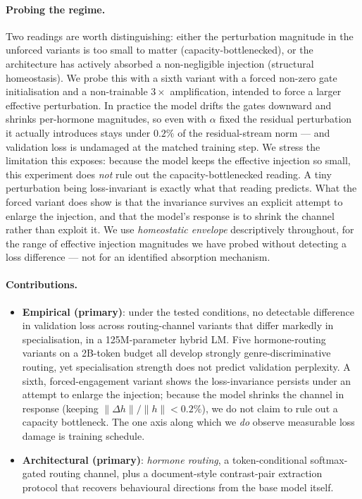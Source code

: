 \paragraph{Probing the regime.} Two readings are worth distinguishing: either the perturbation magnitude in the unforced variants is too small to matter (capacity-bottlenecked), or the architecture has actively absorbed a non-negligible injection (structural homeostasis). We probe this with a sixth variant with a forced non-zero gate initialisation and a non-trainable $3\times$ amplification, intended to force a larger effective perturbation. In practice the model drifts the gates downward and shrinks per-hormone magnitudes, so even with $\alpha$ fixed the residual perturbation it actually introduces stays under $0.2\%$ of the residual-stream norm --- and validation loss is undamaged at the matched training step. We stress the limitation this exposes: because the model keeps the effective injection so small, this experiment does \emph{not} rule out the capacity-bottlenecked reading. A tiny perturbation being loss-invariant is exactly what that reading predicts. What the forced variant does show is that the invariance survives an explicit attempt to enlarge the injection, and that the model's response is to shrink the channel rather than exploit it. We use \emph{homeostatic envelope} descriptively throughout, for the range of effective injection magnitudes we have probed without detecting a loss difference --- not for an identified absorption mechanism.

\paragraph{Contributions.}
\begin{itemize}
    \item \textbf{Empirical (primary)}: under the tested conditions, no detectable difference in validation loss across routing-channel variants that differ markedly in specialisation, in a 125M-parameter hybrid LM. Five hormone-routing variants on a 2B-token budget all develop strongly genre-discriminative routing, yet specialisation strength does not predict validation perplexity. A sixth, forced-engagement variant shows the loss-invariance persists under an attempt to enlarge the injection; because the model shrinks the channel in response (keeping $\|\Delta h\|/\|h\| < 0.2\%$), we do not claim to rule out a capacity bottleneck. The one axis along which we \emph{do} observe measurable loss damage is training schedule.
    \item \textbf{Architectural (primary)}: \emph{hormone routing}, a token-conditional softmax-gated routing channel, plus a document-style contrast-pair extraction protocol that recovers behavioural directions from the base model itself.
\end{itemize}

